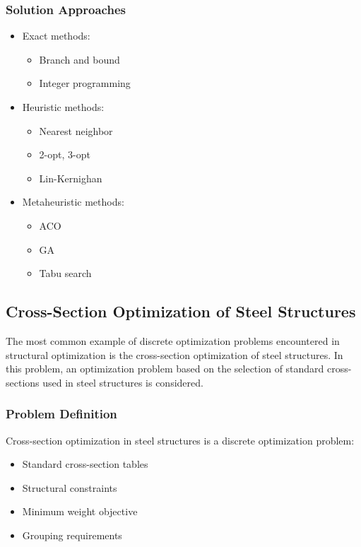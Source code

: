 \subsubsection{Solution Approaches}
\begin{itemize}
    \item Exact methods:
        \begin{itemize}
            \item Branch and bound
            \item Integer programming
        \end{itemize}
    \item Heuristic methods:
        \begin{itemize}
            \item Nearest neighbor
            \item 2-opt, 3-opt
            \item Lin-Kernighan
        \end{itemize}
    \item Metaheuristic methods:
        \begin{itemize}
            \item ACO
            \item GA
            \item Tabu search
        \end{itemize}
\end{itemize}


\subsection{Cross-Section Optimization of Steel Structures}
The most common example of discrete optimization problems encountered in structural optimization is the cross-section optimization of steel structures. In this problem, an optimization problem based on the selection of standard cross-sections used in steel structures is considered.

\subsubsection{Problem Definition}
Cross-section optimization in steel structures is a discrete optimization problem:
\begin{itemize}
    \item Standard cross-section tables
    \item Structural constraints
    \item Minimum weight objective
    \item Grouping requirements
\end{itemize}

